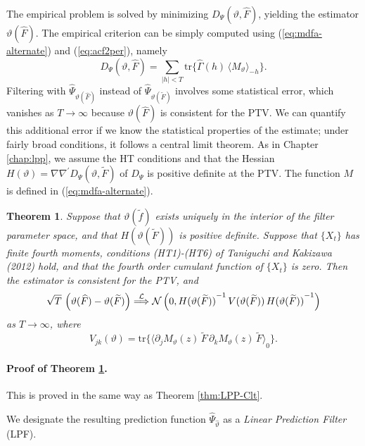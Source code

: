 \documentclass[a4paper]{book}
\def\convinlaw{\stackrel{{\cal L}}{\Longrightarrow }}
\def\tends{\rightarrow}
\newtheorem{Theorem}{Theorem}
\begin{document}
  The empirical problem is solved by minimizing $D_{\Psi} (\vartheta, \widehat{F})$,
 yielding the estimator $\vartheta (\widehat{F})$.  The empirical criterion can be simply 
 computed using (\ref{eq:mdfa-alternate}) and (\ref{eq:acf2per}), namely
\[
   D_{\Psi} (\vartheta, \widehat{F}) = \sum_{|h| < T } \mbox{tr} \{ 
   \widehat{\Gamma} (h) \,  { \langle  M_{\vartheta} \rangle }_{-h} \}.
\] 
Filtering with  $\widehat{\Psi}_{\vartheta (\widehat{F})}$ instead
 of $\widehat{\Psi}_{\vartheta (\widetilde{F})}$
 involves some statistical error, which vanishes as $T \tends \infty$ because
  $\vartheta (  \widehat{F})$ is consistent for the PTV.  We can quantify this additional 
 error if we know the statistical properties of the estimate; under fairly broad conditions,
 it follows a central limit theorem.  As in Chapter \ref{chap:lpp}, we assume 
  the HT conditions and that   the  Hessian  $H(\vartheta) = \nabla \nabla^{\prime}
  D_{\Psi} (\vartheta, \widetilde{F}) $  of $D_{\Psi} $ is positive definite at the PTV.
  The function $M$ is defined in (\ref{eq:mdfa-alternate}).

\begin{Theorem} 
\label{thm:MDFAasymp}
 Suppose that $\vartheta (\widetilde{f})$ exists uniquely in the
 interior of the filter parameter space, and that
 $H(\vartheta (\widetilde{F}))$ is 
 positive definite.  Suppose that $\{ X_t \}$ has finite fourth moments, 
conditions (HT1)-(HT6) of Taniguchi and Kakizawa (2012)
 hold, and that the fourth order cumulant function of $\{ X_t \}$ is zero.  
 Then the estimator is consistent for the PTV, and
\[
 \sqrt{T} \, \left( \vartheta( \widehat{F} ) - \vartheta (\widetilde{F}) \right) 
 \convinlaw \mathcal{N} \left( 0, { H(\vartheta (\widetilde{F})) }^{-1} \, 
 V (\vartheta (\widetilde{F})) \, { H(\vartheta (\widetilde{F})) }^{-1} \right)
\]
 as $T \tends \infty$, where 
\[
  V_{jk} (\vartheta) =  \mbox{tr} \{ { \langle  \partial_j M_{\vartheta} (z) \, \widetilde{F} \,
 \partial_k M_{\vartheta} (z) \, \widetilde{F} \rangle }_0 \}.
\]
\end{Theorem}

\paragraph{Proof of Theorem \ref{thm:MDFAasymp}.}
  This is proved in the same way as Theorem \ref{thm:LPP-Clt}.

\vspace{.5cm}

  We designate the resulting   prediction function
$\widehat{\Psi}_{\widehat{\vartheta}}$  as  a {\em Linear
Prediction Filter} (LPF). 
\end{document}
